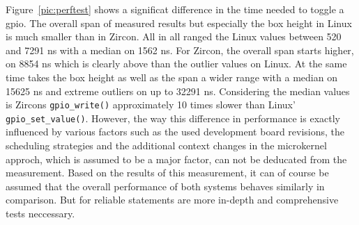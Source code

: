 Figure~\ref{pic:perftest} shows a significat difference in the time needed to toggle a \ac{gpio}.
The overall span of measured results but especially the box height in Linux is much smaller than in Zircon.
All in all ranged the Linux values between 520 and 7291 ns with a median on 1562 ns.
For Zircon, the overall span starts higher, on 8854 ns which is clearly above than the outlier values on Linux.
At the same time takes the box height as well as the span a wider range with a median on 15625 ns and extreme outliers on up to 32291 ns.
Considering the median values is Zircons \texttt{gpio_write()} approximately 10 times slower than Linux' \texttt{gpio_set_value()}.
However, the way this difference in performance is exactly influenced by various factors such as the used development board revisions, the scheduling strategies and the additional context changes in the microkernel approch, which is assumed to be a major factor, can not be deducated from the measurement.
Based on the results of this measurement, it can of course be assumed that the overall performance of both systems behaves similarly in comparison.
But for reliable statements are more in-depth and comprehensive tests neccessary.

